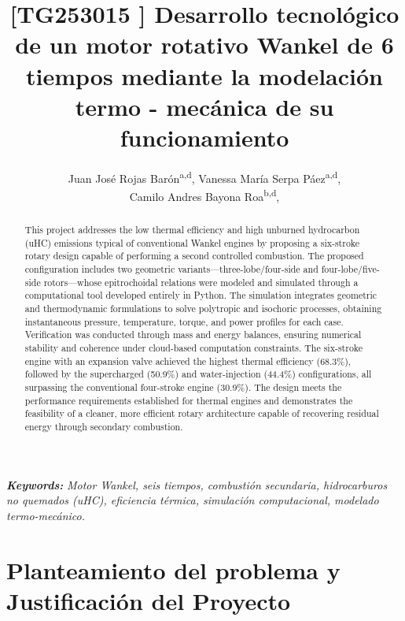 \documentclass{LS}
\title{\LARGE[TG253015 ] Desarrollo tecnológico de un motor rotativo Wankel de 6 tiempos mediante la modelación termo - mecánica de su funcionamiento}
\author{
    Juan José Rojas Barón\textsuperscript{a,d},
    Vanessa María Serpa Páez\textsuperscript{a,d},\\
    Camilo Andres Bayona Roa\textsuperscript{b,d},
    
}
\begin{document}
\maketitle

\noindent\hrulefill
\vspace{-1em} 
\begin{abstract}
This project addresses the low thermal efficiency and high unburned hydrocarbon (uHC) emissions typical of conventional Wankel engines by proposing a six-stroke rotary design capable of performing a second controlled combustion. The proposed configuration includes two geometric variants—three-lobe/four-side and four-lobe/five-side rotors—whose epitrochoidal relations were modeled and simulated through a computational tool developed entirely in Python. The simulation integrates geometric and thermodynamic formulations to solve polytropic and isochoric processes, obtaining instantaneous pressure, temperature, torque, and power profiles for each case. Verification was conducted through mass and energy balances, ensuring numerical stability and coherence under cloud-based computation constraints. The six-stroke engine with an expansion valve achieved the highest thermal efficiency (68.3\%), followed by the supercharged (50.9\%) and water-injection (44.4\%) configurations, all surpassing the conventional four-stroke engine (30.9\%). The design meets the performance requirements established for thermal engines and demonstrates the feasibility of a cleaner, more efficient rotary architecture capable of recovering residual energy through secondary combustion.
\end{abstract}


\vspace{-1em} 

\begin{center}
\textbf{\textit{\fontsize{8}{10}\selectfont Keywords:}} \textit{\fontsize{8}{10}\selectfont   Motor Wankel, seis tiempos, combustión secundaria, hidrocarburos no quemados (uHC), eficiencia térmica, simulación computacional, modelado termo-mecánico. }
\end{center}

\noindent\hrulefill


\section{\bfseries\fontsize{10}{12}\selectfont Planteamiento del problema y Justificación del Proyecto }\label{sec:intro}
\end{document}
